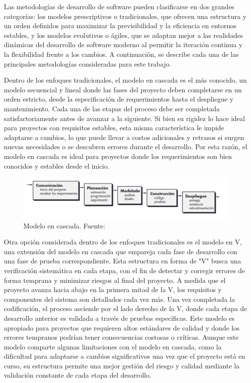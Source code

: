 Las metodologías de desarrollo de software pueden clasificarse en dos grandes categorías: los modelos prescriptivos o tradicionales, que ofrecen una estructura y un orden definidos para maximizar la previsibilidad y la eficiencia en entornos estables, y los modelos evolutivos o ágiles, que se adaptan mejor a las realidades dinámicas del desarrollo de software moderno al permitir la iteración continua y la flexibilidad frente a los cambios. A continuación, se describe cada una de las principales metodologías consideradas para este trabajo.

Dentro de los enfoques tradicionales, el modelo en cascada es el más conocido, un modelo secuencial y lineal donde las fases del proyecto deben completarse en un orden estricto, desde la especificación de requerimientos hasta el despliegue y mantenimiento. Cada una de las etapas del proceso debe ser completada satisfactoriamente antes de avanzar a la siguiente. Si bien su rigidez lo hace ideal para proyectos con requisitos estables, esta misma característica le impide adaptarse a cambios, lo que puede llevar a costos adicionales y retrasos si surgen nuevas necesidades o se descubren errores durante el desarrollo. Por esta razón, el modelo en cascada es ideal para proyectos donde los requerimientos son bien conocidos y estables desde el inicio.

\begin{figure}[h]
    \centering
    \includegraphics[width=\linewidth]{Figures/model-waterfall.png}
    \caption{Modelo en cascada. Fuente: \cite{pressman2010ingenieria}}
\end{figure}

Otra opción considerada dentro de los enfoques tradicionales es el modelo en V, una extensión del modelo en cascada que empareja cada fase de desarrollo con una fase de prueba correspondiente. Esta estructura en forma de "V" busca una verificación sistemática en cada etapa, con el fin de detectar y corregir errores de forma temprana y minimizar riesgos al final del proyecto. A medida que el proyecto avanza hacia abajo en la primera mitad de la V, los requisitos y componentes del sistema son detallados cada vez más. Una vez completada la codificación, el proceso asciende por el lado derecho de la V, donde cada etapa de desarrollo anterior es validada a través de pruebas específicas. Este modelo es apropiado para proyectos que requieren altos estándares de calidad y donde los errores tempranos podrían tener consecuencias costosas o críticas. Aunque este modelo comparte algunas limitaciones con el modelo en cascada, como la dificultad para adaptarse a cambios significativos una vez que el proyecto está en curso, su estructura permite una mejor gestión del riesgo y calidad mediante la validación constante de cada etapa del desarrollo.

